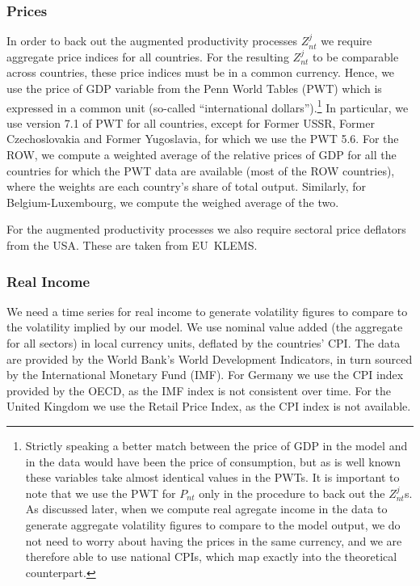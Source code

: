 \documentclass[12pt]{article}
\begin{document}
\subsubsection*{Prices}

In order to back out the augmented productivity processes $Z_{nt}^{j}$ we
require aggregate price indices for all countries. For the resulting $%
Z_{nt}^{j}$ to be comparable across countries, these price indices must be
in a common currency. Hence, we use the price of GDP variable from the Penn
World Tables (PWT) which is expressed in a common unit (so-called
\textquotedblleft international dollars\textquotedblright ).\footnote{%
Strictly speaking a better match between the price of GDP in the model and
in the data would have been the price of consumption, but as is well known
these variables take almost identical values in the PWTs. It is important to
note that we use the PWT for $P_{nt}$ only in the procedure to back out the $%
Z_{nt}^{j}$s. As discussed later, when we compute real agregate income in
the data to generate aggregate volatility figures to compare to the model
output, we do not need to worry about having the prices in the same
currency, and we are therefore able to use national CPIs, which map exactly
into the theoretical counterpart.} In particular, we use version 7.1 of PWT
for all countries, except for Former USSR, Former Czechoslovakia and Former
Yugoslavia, for which we use the PWT 5.6. For the ROW, we compute a weighted
average of the relative prices of GDP for all the countries for which the
PWT data are available (most of the ROW countries), where the weights are
each country's share of total output. Similarly, for Belgium-Luxembourg, we
compute the weighed average of the two.

For the augmented productivity processes we also require sectoral price
deflators from the USA. These are taken from EU\ KLEMS.

\subsubsection*{Real Income}

We need a time series for real income to generate volatility figures to
compare to the volatility implied by our model. We use nominal value added
(the aggregate for all sectors) in local currency units, deflated by the
countries' CPI. The data are provided by the World Bank's World Development
Indicators, in turn sourced by the International Monetary Fund (IMF). For
Germany we use the CPI index provided by the OECD, as the IMF index is not
consistent over time. For the United Kingdom we use the Retail Price Index,
as the CPI index is not available.
\end{document}
